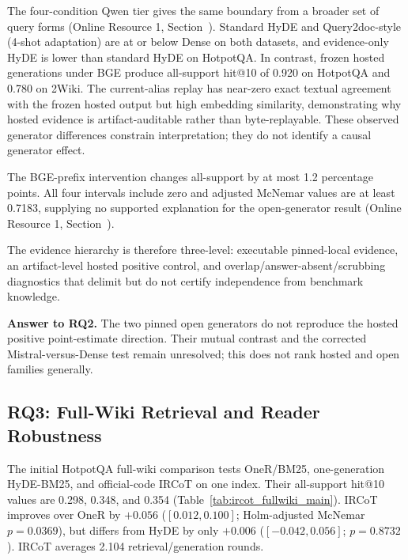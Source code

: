 The four-condition Qwen tier gives the same boundary from a broader set of query forms (Online Resource 1, Section~). Standard HyDE and Query2doc-style (4-shot adaptation) are at or below Dense on both datasets, and evidence-only HyDE is lower than standard HyDE on HotpotQA. In contrast, frozen hosted generations under BGE produce all-support hit@10 of 0.920 on HotpotQA and 0.780 on 2Wiki. The current-alias replay has near-zero exact textual agreement with the frozen hosted output but high embedding similarity, demonstrating why hosted evidence is artifact-auditable rather than byte-replayable. These observed generator differences constrain interpretation; they do not identify a causal generator effect.



The BGE-prefix intervention changes all-support by at most 1.2 percentage points. All four intervals include zero and adjusted McNemar values are at least 0.7183, supplying no supported explanation for the open-generator result (Online Resource 1, Section~).

The evidence hierarchy is therefore three-level: executable pinned-local evidence, an artifact-level hosted positive control, and overlap/answer-absent/scrubbing diagnostics that delimit but do not certify independence from benchmark knowledge.

\noindent\textbf{Answer to RQ2.} The two pinned open generators do not reproduce the hosted positive point-estimate direction. Their mutual contrast and the corrected Mistral-versus-Dense test remain unresolved; this does not rank hosted and open families generally.

\subsection{RQ3: Full-Wiki Retrieval and Reader Robustness}
\label{sec:rq3_fullwiki_reader}

The initial HotpotQA full-wiki comparison tests OneR/BM25, one-generation HyDE-BM25, and official-code IRCoT on one index. Their all-support hit@10 values are 0.298, 0.348, and 0.354 (Table~\ref{tab:ircot_fullwiki_main}). IRCoT improves over OneR by $+0.056$ ($[0.012,0.100]$; Holm-adjusted McNemar $p=0.0369$), but differs from HyDE by only $+0.006$ ($[-0.042,0.056]$; $p=0.8732$). IRCoT averages 2.104 retrieval/generation rounds.



